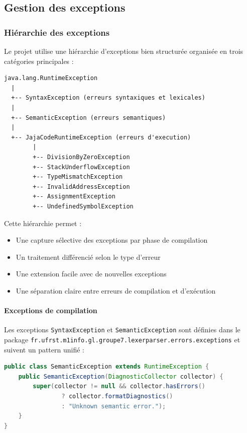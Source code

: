\subsection{Gestion des exceptions}\label{subsec:gestion-des-exceptions}

\subsubsection{Hiérarchie des exceptions}

Le projet utilise une hiérarchie d'exceptions bien structurée organisée en trois catégories principales :

\begin{lstlisting}[caption=Hierarchie des exceptions,label={lst:hierarchie-des-exceptions}]
java.lang.RuntimeException
  |
  +-- SyntaxException (erreurs syntaxiques et lexicales)
  |
  +-- SemanticException (erreurs semantiques)
  |
  +-- JajaCodeRuntimeException (erreurs d'execution)
        |
        +-- DivisionByZeroException
        +-- StackUnderflowException
        +-- TypeMismatchException
        +-- InvalidAddressException
        +-- AssignmentException
        +-- UndefinedSymbolException
\end{lstlisting}

Cette hiérarchie permet :
\begin{itemize}
    \item Une capture sélective des exceptions par phase de compilation
    \item Un traitement différencié selon le type d'erreur
    \item Une extension facile avec de nouvelles exceptions
    \item Une séparation claire entre erreurs de compilation et d'exécution
\end{itemize}

\paragraph{Exceptions de compilation}

Les exceptions \texttt{SyntaxException} et \texttt{SemanticException} sont définies dans le package \texttt{fr.ufrst.m1info.gl.groupe7.lexerparser.errors.exceptions} et suivent un pattern unifié :

\vspace{0.3cm}
\begin{lstlisting}[language=java, caption=Pattern des exceptions de compilation,label={lst:compilation-exception-pattern}]
public class SemanticException extends RuntimeException {
    public SemanticException(DiagnosticCollector collector) {
        super(collector != null && collector.hasErrors()
                ? collector.formatDiagnostics()
                : "Unknown semantic error.");
    }
}
\end{lstlisting}

